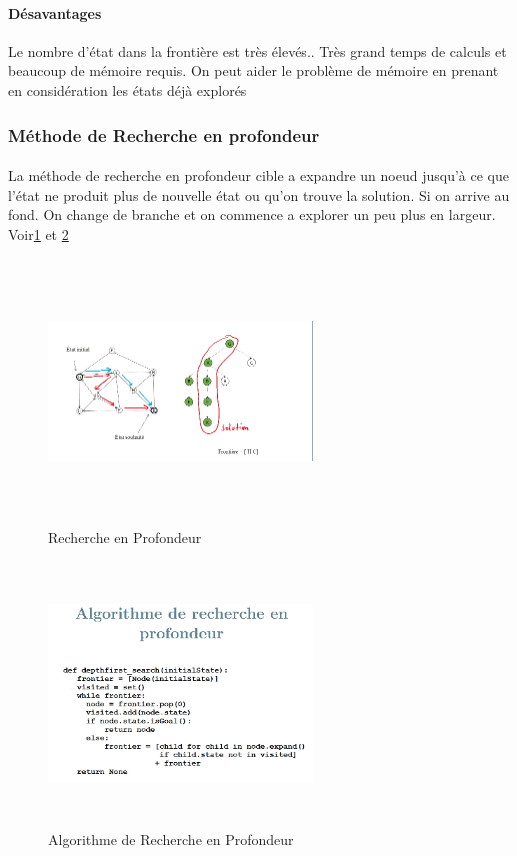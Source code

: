 \documentclass{book}
\begin{document}
\paragraph{Désavantages}
Le nombre d'état dans la frontière est très élevés.. Très grand temps de calculs et beaucoup de mémoire requis. On peut aider le problème de mémoire en prenant en considération les états déjà explorés

\subsubsection{Méthode de Recherche en profondeur}
\paragraph{}
La méthode de recherche en profondeur cible a expandre un noeud jusqu'à ce que l'état ne produit plus de nouvelle état ou qu'on trouve la solution. Si on arrive au fond. On change de branche et on commence a explorer un peu plus en largeur. Voir\ref{fig:Recherche_en_profondeur} et \ref{fig:Algo_Recherche_en_profondeur}

\begin{figure}[!ht]
\centering
\includegraphics[width = 7cm, height = 7cm, keepaspectratio]{Recherche_Profondeur.png}
\caption{Recherche en Profondeur}
\label{fig:Recherche_en_profondeur}
\end{figure}

\begin{figure}[!ht]
\centering
\includegraphics[width = 7cm, height = 7cm, keepaspectratio]{algo_profondeur.png}
\caption{Algorithme de Recherche en Profondeur}
\label{fig:Algo_Recherche_en_profondeur}
\end{figure}
\end{document}
